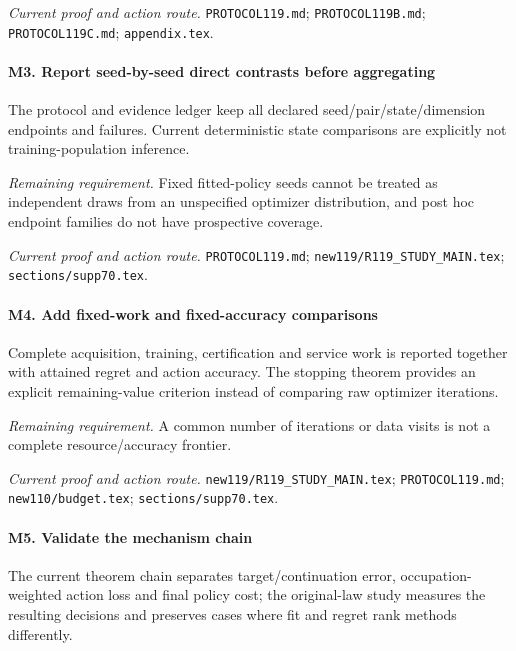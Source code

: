 \par\emph{Current proof and action route.} \nolinkurl{PROTOCOL119.md}; \nolinkurl{PROTOCOL119B.md}; \nolinkurl{PROTOCOL119C.md}; \nolinkurl{appendix.tex}.

\paragraph{M3. Report seed-by-seed direct contrasts before aggregating}

The protocol and evidence ledger keep all declared seed/\allowbreak{}pair/\allowbreak{}state/\allowbreak{}dimension endpoints and failures. Current deterministic state comparisons are explicitly not training-population inference.

\par\emph{Remaining requirement.} Fixed fitted-policy seeds cannot be treated as independent draws from an unspecified optimizer distribution, and post hoc endpoint families do not have prospective coverage.

\par\emph{Current proof and action route.} \nolinkurl{PROTOCOL119.md}; \nolinkurl{new119/R119_STUDY_MAIN.tex}; \nolinkurl{sections/supp70.tex}.

\paragraph{M4. Add fixed-work and fixed-accuracy comparisons}

Complete acquisition, training, certification and service work is reported together with attained regret and action accuracy. The stopping theorem provides an explicit remaining-value criterion instead of comparing raw optimizer iterations.

\par\emph{Remaining requirement.} A common number of iterations or data visits is not a complete resource/\allowbreak{}accuracy frontier.

\par\emph{Current proof and action route.} \nolinkurl{new119/R119_STUDY_MAIN.tex}; \nolinkurl{PROTOCOL119.md}; \nolinkurl{new110/budget.tex}; \nolinkurl{sections/supp70.tex}.

\paragraph{M5. Validate the mechanism chain}

The current theorem chain separates target/\allowbreak{}continuation error, occupation-weighted action loss and final policy cost; the original-law study measures the resulting decisions and preserves cases where fit and regret rank methods differently.

